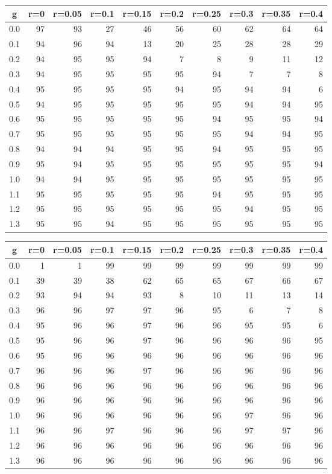 %
\begin{table}[!tbp]
 \begin{center}
 \begin{tabular}{rrrrrrrrrr}\hline\hline
\multicolumn{1}{c}{g}&\multicolumn{1}{c}{r=0}&\multicolumn{1}{c}{r=0.05}&\multicolumn{1}{c}{r=0.1}&\multicolumn{1}{c}{r=0.15}&\multicolumn{1}{c}{r=0.2}&\multicolumn{1}{c}{r=0.25}&\multicolumn{1}{c}{r=0.3}&\multicolumn{1}{c}{r=0.35}&\multicolumn{1}{c}{r=0.4}\tabularnewline
\hline
0.0&97&93&27&46&56&60&62&64&64\tabularnewline
0.1&94&96&94&13&20&25&28&28&29\tabularnewline
0.2&94&95&95&94& 7& 8& 9&11&12\tabularnewline
0.3&94&95&95&95&95&94& 7& 7& 8\tabularnewline
0.4&95&95&95&95&94&95&94&94& 6\tabularnewline
0.5&94&95&95&95&95&95&94&94&95\tabularnewline
0.6&95&95&95&95&95&94&95&95&94\tabularnewline
0.7&95&95&95&95&95&95&94&94&95\tabularnewline
0.8&94&94&94&95&95&94&95&95&95\tabularnewline
0.9&95&94&95&95&95&95&95&95&94\tabularnewline
1.0&94&94&95&95&95&95&95&95&95\tabularnewline
1.1&95&95&95&95&95&94&95&95&95\tabularnewline
1.2&95&95&95&95&95&95&94&95&95\tabularnewline
1.3&95&95&94&95&95&95&95&95&95\tabularnewline
\hline
\end{tabular}

\end{center}

\end{table}

%
\begin{table}[!tbp]
 \begin{center}
 \begin{tabular}{rrrrrrrrrr}\hline\hline
\multicolumn{1}{c}{g}&\multicolumn{1}{c}{r=0}&\multicolumn{1}{c}{r=0.05}&\multicolumn{1}{c}{r=0.1}&\multicolumn{1}{c}{r=0.15}&\multicolumn{1}{c}{r=0.2}&\multicolumn{1}{c}{r=0.25}&\multicolumn{1}{c}{r=0.3}&\multicolumn{1}{c}{r=0.35}&\multicolumn{1}{c}{r=0.4}\tabularnewline
\hline
0.0& 1& 1&99&99&99&99&99&99&99\tabularnewline
0.1&39&39&38&62&65&65&67&66&67\tabularnewline
0.2&93&94&94&93& 8&10&11&13&14\tabularnewline
0.3&96&96&97&97&96&95& 6& 7& 8\tabularnewline
0.4&95&96&96&97&96&96&95&95& 6\tabularnewline
0.5&95&96&96&97&96&96&96&96&95\tabularnewline
0.6&95&96&96&96&96&96&96&96&96\tabularnewline
0.7&96&96&96&97&96&96&96&96&96\tabularnewline
0.8&96&96&96&96&96&96&96&96&96\tabularnewline
0.9&96&96&96&96&96&96&96&96&96\tabularnewline
1.0&96&96&96&96&96&96&97&96&96\tabularnewline
1.1&96&96&97&96&96&96&97&97&96\tabularnewline
1.2&96&96&96&96&96&96&96&96&96\tabularnewline
1.3&96&96&96&96&96&96&96&96&96\tabularnewline
\hline
\end{tabular}

\end{center}

\end{table}

